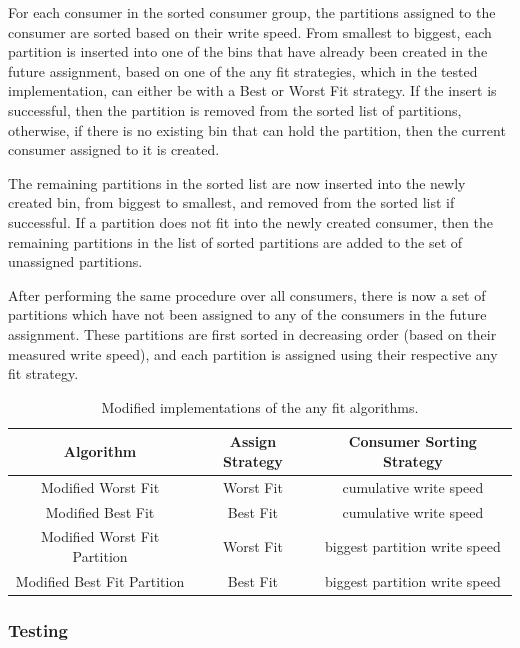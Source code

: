 For each consumer in the sorted consumer group, the partitions assigned to the
    consumer are sorted based on their write speed. From smallest to biggest,
    each partition is inserted into one of the bins that have already been
    created in the future assignment, based on one of the any fit strategies,
    which in the tested implementation, can either be with a Best or Worst Fit
    strategy. If the insert is successful, then the partition is removed from
    the sorted list of partitions, otherwise, if there is no existing bin that
    can hold the partition, then the current consumer assigned to it is created. 

The remaining partitions in the sorted list are now inserted into the newly
created bin, from biggest to smallest, and removed from the sorted list if
successful. If a partition does not fit into the newly created consumer, then
the remaining partitions in the list of sorted partitions are added to the set
of unassigned partitions.

After performing the same procedure over all consumers, there is now a set of
partitions which have not been assigned to any of the consumers in the future
assignment. These partitions are first sorted in decreasing order (based on
their measured write speed), and each partition is assigned using their
respective any fit strategy.

\begin{table}[H] \centering \caption{Modified implementations of the any fit
    algorithms.} \begin{tabular}{ |c|c|c| } \hline \textbf{Algorithm} &
        \textbf{Assign Strategy} & \textbf{Consumer Sorting Strategy} \\ \hline
        Modified Worst Fit & Worst Fit & cumulative write speed \\ Modified Best
        Fit & Best Fit & cumulative write speed \\ Modified Worst Fit Partition
        & Worst Fit & biggest partition write speed \\ Modified Best Fit
        Partition &  Best Fit & biggest partition write speed \\ \hline
    \end{tabular} \end{table}

\subsubsection{Testing} \label{c3subsub:testing}

